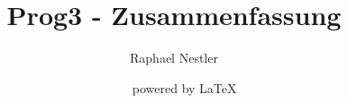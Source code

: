 \documentclass[ngerman,english]{scrartcl}
\title{Prog3 - Zusammenfassung}
\author{Raphael Nestler}
\date{\revisiondate ~ \revision ~ powered by \LaTeX}
\begin{document}
 
\twocolumn








 
\end{document}

